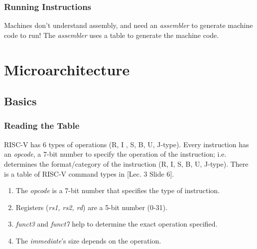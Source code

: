 \documentclass{report}
\begin{document}
\subsection{Running Instructions}
Machines don't understand assembly, and need an \textit{assembler} to generate machine code to run!
The \textit{assembler} uses a table to generate the machine code.





\chapter{Microarchitecture}

\section{Basics}
\subsection{Reading the Table}
RISC-V has 6 types of operations (R, I , S, B, U, J-type). Every instruction has an \textit{opcode},
a 7-bit number to specify the operation of the instruction; i.e. determines the format/category of
the instruction (R, I, S, B, U, J-type).
\newline
\newline
There is a table of RISC-V command types in [Lec. 3 Slide 6].
\newline
\newline
\begin{enumerate}[label=\textit{(\roman*)}]
\item The \textit{opcode} is a 7-bit number that specifies the type of instruction.
\item Registers (\textit{rs1, rs2, rd}) are a 5-bit number (0-31).
\item \textit{funct3} and \textit{funct7} help to determine the exact operation specified.
\item The \textit{immediate}'s size depends on the operation.
\end{enumerate}
\end{document}
